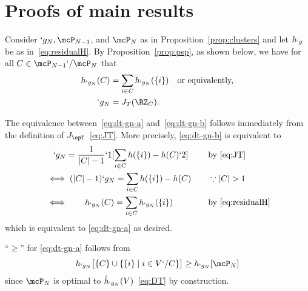 \section{Proofs of main results}
 \label{sec:proof}
 

 
\begin{Proof}
	Consider $`g_N,\mcP_{N-1}$, and $\mcP_{N}$ as in Proposition~\ref{prop:clusters} and let $h_{`g}$
	be as in~\eqref{eq:residualH}.
	By Proposition~\ref{prop:psp},
	as shown below, we have for all $C\in \mcP_{N-1}`/\mcP_{N}$ that 
	\begin{subequations}
		\begin{align}
			h_{`g_{N}}(C)&=\sum_{i\in C}h_{`g_{N}}(\Set{i}) \kern1em \text{or equivalently,}
			\label{eq:dt-gn-a}
			\\
			`g_{N}&=J_{T}(\RZ_C).
			\label{eq:dt-gn-b}
		\end{align}
	\end{subequations}
\begin{compactitem}

	\item  The equivalence between~\eqref{eq:dt-gn-a} and~\eqref{eq:dt-gn-b} follows immediately from
		the definition of $J_{\opT}$~\eqref{eq:JT}. More precisely, \eqref{eq:dt-gn-b} is equivalent to
	\begin{alignat*}{2}
	&\kern1em `g_N  =\frac1 {\abs{C}-1}`1[\sum_{i \in C}h(\Set {i})- h(C)`2] &\kern1em &\text {by \eqref{eq:JT}} \\
	&\iff (\abs{C}-1) `g_N = \sum_{i \in C} h(\Set {i})- h(C) & & \because \abs {C}>1\\
	&\iff \kern1.8em h_{`g_N}(C) = \sum_{i \in C} h_{`g_N}(\Set {i}) && \text {by \eqref{eq:residualH}}
	\end{alignat*}
	which is equivalent to \eqref{eq:dt-gn-a} as desired.

	\item ``$\geq$'' for \eqref{eq:dt-gn-a}
	follows from 
	\begin{align*}
	h_{`g_{N}}\big[\Set{C}\cup\Set{\Set{i}\mid i\in V`/C}\big]
	\geq
	h_{`g_{N}}[\mcP_N]
	\end{align*}
	since $\mcP_N$ is optimal to $\hat{h}_{`g_{N}}(V)$~\eqref{eq:DT} by construction.


\end{compactitem}
\end{Proof}
